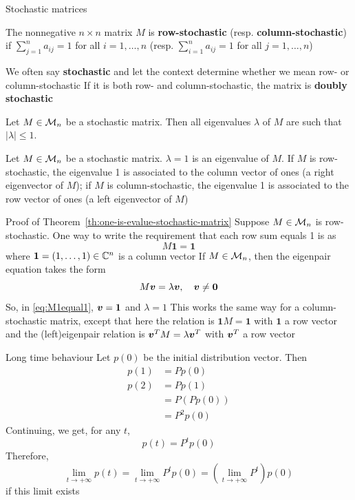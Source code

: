 \documentclass[aspectratio=169]{beamer}\usepackage[]{graphicx}\usepackage[]{xcolor}
\begin{document}
\begin{frame}{Stochastic matrices}
\begin{definition}
The nonnegative $n\times n$ matrix $M$ is \textbf{row-stochastic} (resp. \textbf{column-stochastic}) if $\sum_{j=1}^na_{ij}=1$ for all $i=1,\dots,n$ (resp. $\sum_{i=1}^na_{ij}=1$ for all $j=1,\dots,n$)
\end{definition}
\vfill
We often say \textbf{stochastic} and let the context determine whether we mean row- or column-stochastic
\vfill
If it is both row- and column-stochastic, the matrix is \textbf{doubly stochastic}
\vfill
\begin{theorem}\label{th:spectrum_stochastic_matrix}
Let $M\in\mathcal{M}_n$ be a stochastic matrix. Then all eigenvalues $\lambda$ of $M$ are such that $|\lambda|\leq 1$.
\end{theorem}
\end{frame}

\begin{frame}
\begin{theorem}
\label{th:one-is-evalue-stochastic-matrix}
Let $M\in\mathcal{M}_n$ be a stochastic matrix. $\lambda =1$ is an eigenvalue of $M$. 
If $M$ is row-stochastic, the eigenvalue 1 is associated to the column vector of ones (a right eigenvector of $M$); if $M$ is column-stochastic, the eigenvalue 1 is associated to the row vector of ones (a left eigenvector of $M$)
\end{theorem}
\end{frame}

\begin{frame}[red]{Proof of Theorem~\ref{th:one-is-evalue-stochastic-matrix}}
Suppose $M\in\mathcal{M}_n$ is row-stochastic. One way to write the requirement that each row sum equals 1 is as 
\begin{equation}\label{eq:M1equal1}
M\mathbf{1}=\mathbf{1}
\end{equation}
where $\mathbf{1}=(1,\ldots,1)\in\mathbb{C}^n$ is a column vector
\vfill
If $M\in\mathcal{M}_n$, then the eigenpair equation takes the form
\[
M\bv=\lambda\bv,\quad \bv\neq\b0
\]
So, in \eqref{eq:M1equal1}, $\bm{v}=\mathbf{1}$ and $\lambda=1$
\vfill
This works the same way for a column-stochastic matrix, except that here the relation is $\mathbf{1}M=\mathbf{1}$ with $\mathbf{1}$ a row vector and the (left)eigenpair relation is $\bm{v}^TM=\lambda\bm{v}^T$ with $\bm{v}^T$ a row vector
\end{frame}

\begin{frame}{Long time behaviour}
Let $p(0)$ be the initial distribution vector. Then
\begin{align*}
p(1) &= Pp(0) \\
p(2) &= Pp(1) \\
&= P\left(Pp(0)\right) \\
&= P^2p(0)
\end{align*}
\vfill
Continuing, we get, for any $t$,
\[
p(t)=P^tp(0)
\]
\vfill
Therefore, 
\[
\lim_{t\rightarrow +\infty}p(t) =
\lim_{t\rightarrow +\infty}P^tp(0) =
\left(\lim_{t\rightarrow +\infty}P^t\right)
p(0)
\]
if this limit exists
\end{frame}
\end{document}
